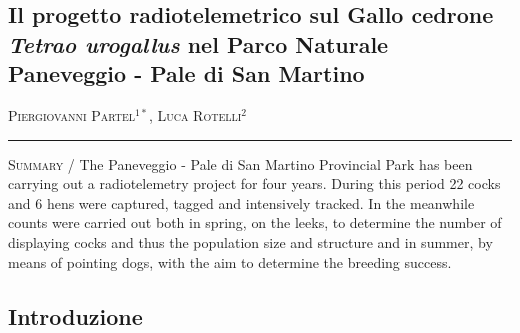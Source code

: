 \setcounter{figure}{0}
\setcounter{table}{0}

\begin{adjustwidth}{-3.5cm}{0cm}
\pagestyle{CIOpage}
\chapter*[Progetto radiotelemetrico sul Gallo cedrone]{Il progetto radiotelemetrico sul
Gallo cedrone \textit{Tetrao urogallus} nel Parco Naturale
Paneveggio - Pale di San Martino}

\textsc{Piergiovanni Partel}$^{1*}$, \textsc{Luca Rotelli}$^{2}$  \\

 
\noindent\color{MUSEBLUE}\rule{27cm}{2pt}
\vspace{1cm}
\end{adjustwidth}


{\small
\noindent \textsc{\color{MUSEBLUE} Summary} / The Paneveggio - Pale di San Martino Provincial Park has been carrying
out a radiotelemetry project for four years. During this period 22
cocks and 6 hens were captured, tagged and intensively tracked. In the
meanwhile counts were carried out both in spring, on the leeks, to
determine the number of displaying cocks and thus the population size
and structure and in summer, by means of pointing dogs, with the aim to
determine the breeding success.\\
}


\section*{Introduzione}

